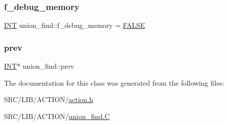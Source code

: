 \mbox{\label{classunion__find_ad614e9cdd4741f748e953c744892d3bd}} 
\subsubsection{\texorpdfstring{f\+\_\+debug\+\_\+memory}{f\_debug\_memory}}
{\footnotesize\ttfamily \mbox{\hyperlink{galois_8h_a09fddde158a3a20bd2dcadb609de11dc}{I\+NT}} union\+\_\+find\+::f\+\_\+debug\+\_\+memory = \mbox{\hyperlink{nauty_8h_aa93f0eb578d23995850d61f7d61c55c1}{F\+A\+L\+SE}}\hspace{0.3cm}{\ttfamily [static]}}

\mbox{\label{classunion__find_ac0a49d7e715e1627cc35f9eb6a62367f}} 
\subsubsection{\texorpdfstring{prev}{prev}}
{\footnotesize\ttfamily \mbox{\hyperlink{galois_8h_a09fddde158a3a20bd2dcadb609de11dc}{I\+NT}}$\ast$ union\+\_\+find\+::prev}



The documentation for this class was generated from the following files\+:\begin{DoxyCompactItemize}
\item 
S\+R\+C/\+L\+I\+B/\+A\+C\+T\+I\+O\+N/\mbox{\hyperlink{action_8h}{action.\+h}}\item 
S\+R\+C/\+L\+I\+B/\+A\+C\+T\+I\+O\+N/\mbox{\hyperlink{union__find_8_c}{union\+\_\+find.\+C}}\end{DoxyCompactItemize}
